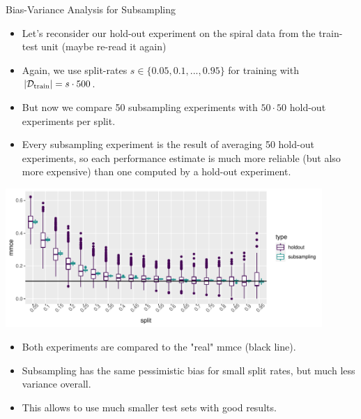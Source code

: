 \documentclass[11pt,compress,t,notes=noshow, xcolor=table]{beamer}
\begin{document}

\begin{vbframe}{Bias-Variance Analysis for Subsampling}

  \begin{itemize}
    \item Let's reconsider our hold-out experiment on the spiral data from the train-test unit (maybe re-read it again)
    \item Again, we use split-rates $s \in \{0.05, 0.1, ..., 0.95\}$ for training with $|\mathcal{D}_{\text{train}}| = s \cdot 500$.
    \item But now we compare 50 subsampling experiments with $50 \cdot 50$ hold-out experiments per split.
    \item Every subsampling experiment is the result of averaging 50 hold-out experiments, so each performance estimate is much more reliable (but also more expensive) than one computed by a hold-out experiment.
  \end{itemize}

\framebreak


\begin{center}
\includegraphics[width=0.9\textwidth]{figure/eval-resampling-example-1}
\end{center}



\begin{itemize}
  \item Both experiments are compared to the "real" mmce (black line).
  \item Subsampling has the same pessimistic bias for small split rates, but much less variance overall.
  \item This allows to use much smaller test sets with good results.
\end{itemize}

\framebreak


\end{vbframe}
\end{document}
